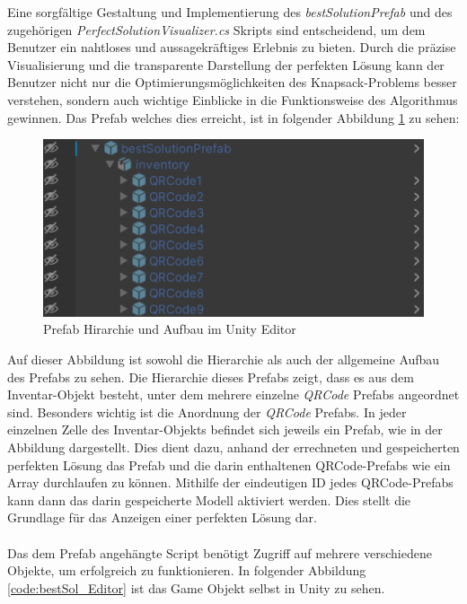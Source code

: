 Eine sorgfältige Gestaltung und Implementierung des \textit{bestSolutionPrefab} und des zugehörigen \textit{PerfectSolutionVisualizer.cs}
Skripts sind entscheidend, um dem Benutzer ein nahtloses und aussagekräftiges Erlebnis zu bieten. Durch die präzise
Visualisierung und die transparente Darstellung der perfekten Lösung kann der Benutzer nicht nur die Optimierungsmöglichkeiten
des Knapsack-Problems besser verstehen, sondern auch wichtige Einblicke in die Funktionsweise des Algorithmus gewinnen.
Das Prefab welches dies erreicht, ist in folgender Abbildung \ref{fig:InvPref} zu sehen:
\begin{figure}[H]
\centering
\includegraphics[scale=1]{images/bestSolPref}
\caption{Prefab Hirarchie und Aufbau im Unity Editor}
\label{fig:InvPref}
\end{figure}

Auf dieser Abbildung ist sowohl die Hierarchie als auch der allgemeine Aufbau des Prefabs zu sehen. Die Hierarchie dieses
Prefabs zeigt, dass es aus dem Inventar-Objekt besteht, unter dem mehrere einzelne \textit{QRCode} Prefabs angeordnet sind.
Besonders wichtig ist die Anordnung der \textit{QRCode} Prefabs. In jeder einzelnen Zelle des Inventar-Objekts befindet
sich jeweils ein Prefab, wie in der Abbildung dargestellt. Dies dient dazu, anhand der errechneten und gespeicherten
perfekten Lösung das Prefab und die darin enthaltenen QRCode-Prefabs wie ein Array durchlaufen zu können. Mithilfe der
eindeutigen ID jedes QRCode-Prefabs kann dann das darin gespeicherte Modell aktiviert werden. Dies stellt die Grundlage
für das Anzeigen einer perfekten Lösung dar.
\\
\\
Das dem Prefab angehängte Script benötigt Zugriff auf mehrere verschiedene Objekte, um erfolgreich zu funktionieren. In
folgender Abbildung \ref{code:bestSol_Editor} ist das Game Objekt selbst in Unity zu sehen.

